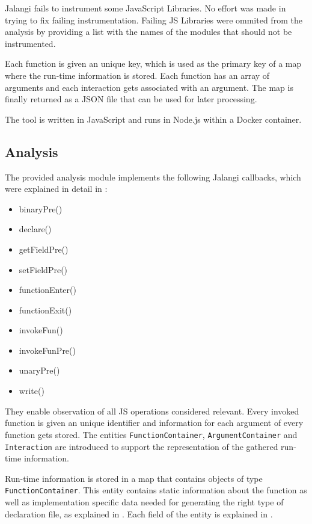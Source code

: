 Jalangi fails to instrument some JavaScript Libraries. No effort was made in trying to fix failing instrumentation. Failing JS Libraries were ommited from the analysis by providing a list with the names of the modules that should not be instrumented.

Each function is given an unique key, which is used as the primary key of a map where the run-time information is stored. Each function has an array of arguments and each interaction gets associated with an argument. The map is finally returned as a JSON file that can be used for later processing.

The tool is written in JavaScript and runs in Node.js within a Docker container.



\subsection{Analysis} \label{sec:run-time-analysis}
The provided analysis module implements the following Jalangi callbacks, which were explained in detail in :
\begin{itemize}
  \item binaryPre()
  \item declare()
  \item getFieldPre()
  \item setFieldPre()
  \item functionEnter()
  \item functionExit()
  \item invokeFun()
  \item invokeFunPre()
  \item unaryPre()
  \item write()
\end{itemize}

They enable observation of all JS operations considered relevant. Every invoked function is given an unique identifier and information for each argument of every function gets stored. The entities \texttt{FunctionContainer}, \texttt{ArgumentContainer} and \texttt{Interaction} are introduced to support the representation of the gathered run-time information. 

Run-time information is stored in a map that contains objects of type \texttt{FunctionContainer}.
This entity contains static information about the function as well as implementation specific data needed for generating the right type of declaration file, as explained in . Each field of the entity is explained in .

